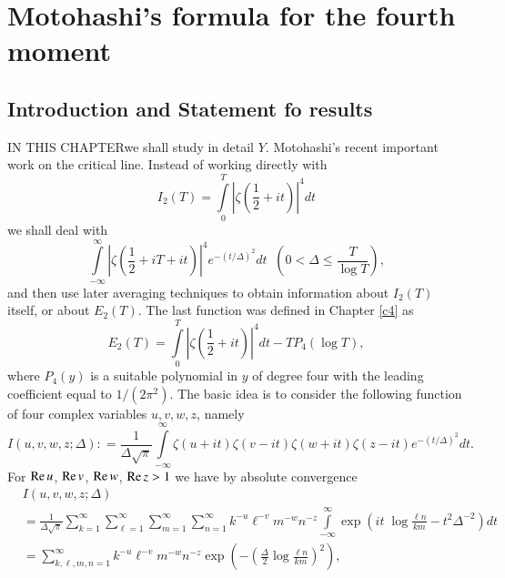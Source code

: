 \chapter{Motohashi's formula for the fourth moment}\label{c5}

\section{Introduction and Statement fo results}\label{c5:sec5.1}

IN THIS CHAPTER\pageoriginale we shall study in detail $Y$. Motohashi's recent important work on the critical line. Instead of working directly with
 $$
 I_2 (T) = \int\limits^T_0 \left|\zeta \left(\frac{1}{2} + it \right)\right|^4 dt
 $$
 we shall deal with
 \begin{equation}
 \int\limits^\infty_{-\infty} \left|\zeta\left(\frac{1}{2} + iT + it \right) \right|^4 e^{-(t/\Delta)^2} dt \;\; \left(0 < \Delta \leq \frac{T}{\log T} \right),
 \label{c5:eq5.1}
 \end{equation}
 and then use later averaging techniques to obtain information about $I_2(T)$ itself, or about $E_2(T)$. The last function was defined in Chapter \ref{c4} as 
 \begin{equation}
 E_2 (T) = \int\limits^T_0 \left| \zeta\left( \frac{1}{2} + it\right)\right|^4 dt - TP_4 (\log T),\label{c5:eq5.2}
 \end{equation}
 where $P_4(y)$ is a suitable polynomial in $y$ of degree four with
 the leading coefficient equal to $1/(2\pi^2)$. The basic idea is to
 consider the following function of four complex variables $u,v,w,z$,
 namely 
{\fontsize{10pt}{12pt}\selectfont
 \begin{equation}
 I(u, v,w,z; \Delta) : = \frac{1}{\Delta \sqrt{\pi}} \int\limits^\infty_{-\infty} \zeta (u+ it) \zeta (v-it) \zeta (w+ it) \zeta (z - it) e^{-(t/\Delta)^2} dt.\label{c5:eq5.3}
 \end{equation}}
 For $\operatorname{Re} u$, $\operatorname{Re} v$, $\operatorname{Re} w$, $\operatorname{Re} z >1$ we have by absolute convergence
 \begin{align*}
& I (u,v,w,z;\Delta )\\
& = \frac{1}{\Delta \sqrt{\pi}} \sum\limits^\infty_{k=1}
   \sum\limits^\infty_{\ell=1} \sum\limits^\infty_{m=1}
   \sum\limits^\infty_{n=1} k^{-u} \ell^{-v} m^{-w} n^{-z}
   \int\limits^\infty_{-\infty} \exp \left(it \;\log \frac{\ell n}{km}
   - t^2 \Delta^{-2}\right) dt\\ 
& = \sum\limits^\infty_{k, \ell, m, n=1} k^{-u} \ell^{-v} m^{-w} n^{-z}\exp \left(-\left(\frac{\Delta}{2} \log \frac{\ell n}{km} \right)^2 \right), 
 \end{align*}
